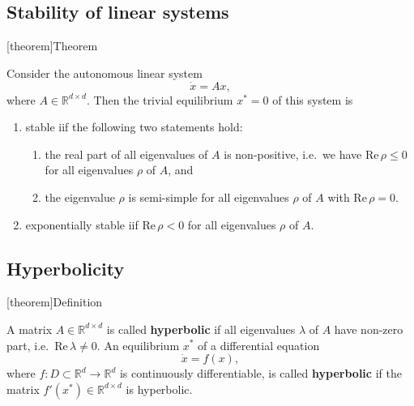 \documentclass[12pt]{report}
\theoremstyle{definition}
\begin{document}
\subsection{Stability of linear systems}

[theorem]{Theorem}
\begin{stability of linear systems}
    Consider the autonomous linear system
    \[
        \dot{x}=Ax,
    \]
    where $A\in\mathbb{R}^{d\times d}$. Then the trivial equilibrium $x^*=0$ of
    this system is
    \begin{enumerate}[label = (\roman*)]
        \item stable iif the following two statements hold:
            \begin{enumerate}[label = (\alph*)]
                \item the real part of all eigenvalues of $A$ is non-positive,
                    i.e.\ we have $\text{Re}\,\rho\le 0$ for all eigenvalues
                    $\rho$ of $A$, and
                \item the eigenvalue $\rho$ is semi-simple for all eigenvalues
                    $\rho$ of $A$ with $\text{Re}\,\rho=0$.
            \end{enumerate} 
        \item exponentially stable iif $\text{Re}\,\rho<0$ for all eigenvalues 
            $\rho$ of $A$.
    \end{enumerate} 
\end{stability of linear systems}

\subsection{Hyperbolicity}

[theorem]{Definition}
\begin{hyperbolicity}
    A matrix $A\in\mathbb{R}^{d\times d}$ is called \textbf{hyperbolic}
    if all eigenvalues $\lambda$ of $A$ have non-zero part, i.e.\
    $\text{Re}\,\lambda\neq 0$. An equilibrium $x^*$ of a differential equation
    \[
        \dot{x}=f(x),
    \]
    where $f:D\subset \mathbb{R}^{d}\rightarrow\mathbb{R}^{d}$ is continuously
    differentiable, is called \textbf{hyperbolic} if the matrix
    $f'(x^*)\in\mathbb{R}^{d\times d}$ is hyperbolic.
\end{hyperbolicity}
\end{document}
